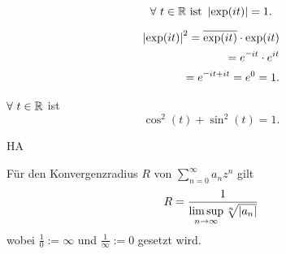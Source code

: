 \documentclass[../ana1.tex]{subfiles}
\begin{document}
\begin{satz}
    \[ \forall \, t\in\R \text{ ist } \abs{\exp(it)} = 1. \]
\end{satz}
\begin{bew}
    \begin{align*}
        \abs{\exp(it)}^2 = \overline{\exp(it)} \cdot \exp(it)\\
        = e^{\minus i t} \cdot e^{it}\\
        = e^{\minus it + it} = e^0 = 1.
    \end{align*}
\end{bew}
\begin{kor}
    \( \forall \, t\in\R \) ist 
    \[ \cos^2 (t) + \sin^2 (t) = 1. \]
\end{kor}
\begin{bew}
    HA
\end{bew}
\begin{lem}
    Für den Konvergenzradius \( R \) von \( \sum_{n=0}^\infty a_n z^n \) gilt
    \[ R = \frac{1}{\limsup\limits_{n\rightarrow\infty} \sqrt[n]{\left|a_n\right|}} \]
    wobei \(\frac{1}{0} := \infty \) und \( \frac{1}{\infty} := 0 \) gesetzt wird.
\end{lem}
\end{document}
